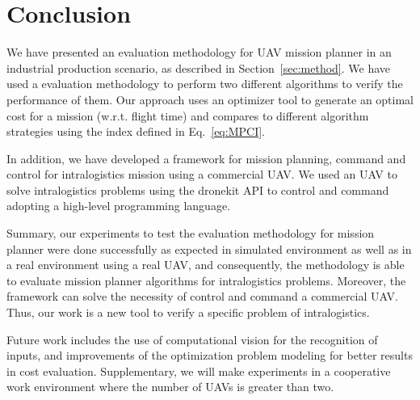 \documentclass[conference]{IEEEtran}
\begin{document}




\section{Conclusion}
\label{sec:conclusao}

We have presented an evaluation methodology for UAV mission planner in an industrial production scenario, as described in Section~\ref{sec:method}. We have used a evaluation methodology to perform two different algorithms to verify the performance of them. Our approach uses an optimizer tool to generate an optimal cost for a mission (w.r.t. flight time) and compares to different algorithm strategies using the index defined in Eq.~\ref{eq:MPCI}.
 
In addition, we have developed a framework for mission planning, command and control for intralogistics mission using a commercial UAV. We used an UAV to solve intralogistics problems using the dronekit API to control and command adopting a high-level programming language.

Summary, our experiments to test the evaluation methodology for mission planner were done successfully as expected in simulated environment as well as in a real environment using a real UAV, and consequently, the methodology is able to evaluate mission planner algorithms for intralogistics problems. Moreover, the framework can solve the necessity of control and command a commercial UAV. Thus, our work is a new tool to verify a specific problem of intralogistics.

Future work includes the use of computational vision for the recognition of inputs, and improvements of the optimization problem modeling for better results in cost evaluation. Supplementary, we will make experiments in a cooperative work environment where the number of UAVs is greater than two.




\end{document}
